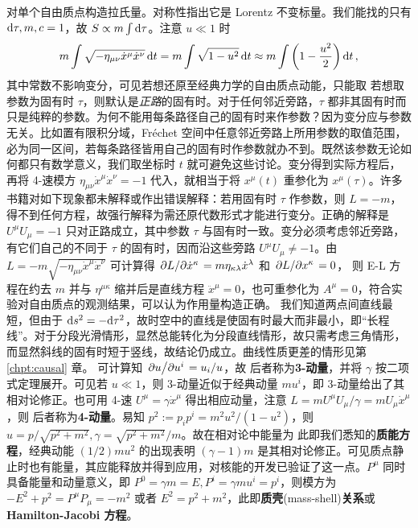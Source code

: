对单个自由质点构造拉氏量。对称性指出它是 Lorentz 不变标量。我们能找的只有 $\dd\tau,m,c=1$，故 $S\propto m\int \dd\tau$。注意 $u\ll 1$ 时
\[
m\int\sqrt{-\eta_{\mu\nu}\dot x^\mu \dot x^\nu}\dd{t}=m\int\sqrt{1-u^2}\dd{t}\approx m\int\left(1-\frac{u^2}{2}\right)\dd{t},
\]
其中常数不影响变分，可见若想还原至经典力学的自由质点动能，只能取
若想取参数为固有时 $\tau$，则默认是\textit{正路}的固有时。对于任何邻近旁路，$\tau$ 都非其固有时而只是纯粹的参数。为何不能用每条路径自己的固有时来作参数？因为变分应与参数无关。比如置有限积分域，Fréchet 空间中任意邻近旁路上所用参数的取值范围，必为同一区间，若每条路径皆用自己的固有时作参数就办不到。既然该参数无论如何都只有数学意义，我们取坐标时 $t$ 就可避免这些讨论。变分得到实际方程后，再将 4-速模方 $\eta_{\mu\nu}\dot x^\mu \dot x^\nu=-1$ 代入，就相当于将 $x^\mu(t)$ 重参化为 $x^\mu(\tau)$。许多书籍对如下现象都未解释或作出错误解释：若用固有时 $\tau$ 作参数，则 $L=-m$，得不到任何方程，故强行解释为需还原代数形式才能进行变分。正确的解释是 $U^\mu U_\mu=-1$ 只对正路成立，其中参数 $\tau$ 与固有时一致。变分必须考虑邻近旁路，有它们自己的不同于 $\tau$ 的固有时，因而沿这些旁路 $U^\mu U_\mu\ne -1$。由 $L=-m\sqrt{-\eta_{\mu\nu}\dot x^\mu\dot x^\nu}$ 可计算得 $\pdv*{L}{\dot x^\kappa}=m\eta_{\kappa\lambda}\dot x^\lambda$ 和 $\pdv*{L}{x^\kappa}=0$，
则 E-L 方程在约去 $m$ 并与 $\eta^{\mu\kappa}$ 缩并后是直线方程 $\ddot x^\mu=0$，也可重参化为 $A^\mu=0$，符合实验对自由质点的观测结果，可以认为作用量构造正确。
我们知道两点间直线最短，但由于 $\dd s^2=-\dd\tau^2$，故时空中的直线是使固有时最大而非最小，即“长程线”。对于分段光滑情形，显然总能转化为分段直线情形，故只需考虑三角情形，而显然斜线的固有时短于竖线，故结论仍成立。曲线性质更差的情形见第 \ref{chpt:causal} 章。
可计算知 $\pdv*{u}{u^i}=u_i/u$，故
后者称为\textbf{3-动量}，并将 $\gamma$ 按二项式定理展开。可见若 $u\ll 1$，则 3-动量近似于经典动量 $m u^i$，即 3-动量给出了其相对论修正。也可用 4-速 $U^\mu=\gamma\dot x^\mu$ 得出相应动量，注意 $L=m U^\mu U_\mu/\gamma=m U_\mu \dot x^\mu$，则
后者称为\textbf{4-动量}。易知 $p^2:=p_i p^i=m^2u^2/(1-u^2)$，则 $u={p}/{\sqrt{p^2+m^2}},\gamma={\sqrt{p^2+m^2}}/{m}$。故在相对论中能量为
此即我们悉知的\textbf{质能方程}，经典动能 $(1/2)mu^{2}$ 的出现表明 $(\gamma-1)m$ 是其相对论修正。可见质点静止时也有能量，其应能释放并得到应用，对核能的开发已验证了这一点。$P^\mu$ 同时具备能量和动量意义，即 $P^0=\gamma m=E,P^i=\gamma m u^i=p^i$，则模方为 $-E^2+p^2=P^\mu P_\mu=-m^2$ 或者 $E^2= p^2+m^2$，此即\textbf{质壳}(mass-shell)\textbf{关系}或\textbf{Hamilton-Jacobi 方程}。

